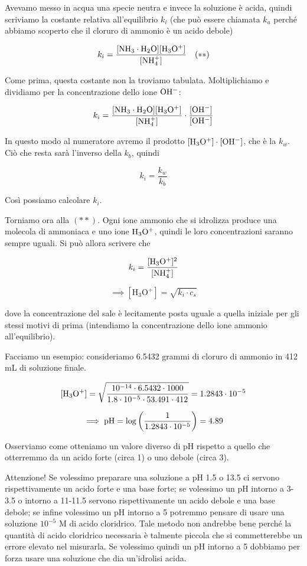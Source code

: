 Avevamo messo in acqua una specie neutra e invece la soluzione è acida, quindi scriviamo la costante relativa all'equilibrio $k_i$ (che può essere chiamata $k_a$ perché abbiamo scoperto che il cloruro di ammonio è un acido debole)

$$k_i=\rm \frac{[NH_3 \cdot H_2O][H_3O^+]}{[NH_4^+]} \quad (**)$$

Come prima, questa costante non la troviamo tabulata. Moltiplichiamo e dividiamo per la concentrazione dello ione $\rm OH^-$:

$$k_i=\rm \frac{[NH_3 \cdot H_2O][H_3O^+]}{[NH_4^+]} \cdot \frac{[OH^-]}{[OH^-]}$$

In questo modo al numeratore avremo il prodotto $\rm [H_3O^+] \cdot [OH^-]$, che è la $k_w$. Ciò che resta sarà l'inverso della $k_b$, quindi

$$k_i=\frac{k_w}{k_b}$$

Così possiamo calcolare $k_i$.

Torniamo ora alla $(**)$. Ogni ione ammonio che si idrolizza produce una molecola di ammoniaca e uno ione $\rm H_3O^+$, quindi le loro concentrazioni saranno sempre uguali. Si può allora scrivere che

$$k_i=\rm \frac{[H_3O^+]^2}{[NH_4^+]}$$

$$\implies [\text{H}_3\text{O}^+]=\sqrt{k_i \cdot c_s}$$

dove la concentrazione del sale è lecitamente posta uguale a quella iniziale per gli stessi motivi di prima (intendiamo la concentrazione dello ione ammonio all'equilibrio).

\vspace{0.2cm}Facciamo un esempio: consideriamo 6.5432 grammi di cloruro di ammonio in 412 mL di soluzione finale.

$$\rm [H_3O^+]=\sqrt{\frac{10^{-14} \cdot 6.5432 \cdot 1000}{1.8 \cdot 10^{-5} \cdot 53.491 \cdot 412}}=1.2843 \cdot 10^{-5}$$

$$\implies \rm pH=\log{\left( \frac{1}{1.2843 \cdot 10^{-5}} \right)}=4.89$$

Osserviamo come otteniamo un valore diverso di pH rispetto a quello che otterremmo da un acido forte (circa 1) o uno debole (circa 3).

Attenzione! Se volessimo preparare una soluzione a pH 1.5 o 13.5 ci servono rispettivamente un acido forte e una base forte; se volessimo un pH intorno a 3-3.5 o intorno a 11-11.5 servono rispettivamente un acido debole e una base debole; se infine volessimo un pH intorno a 5 potremmo pensare di usare una soluzione $10^{-5}$ M di acido cloridrico. Tale metodo non andrebbe bene perché la quantità di acido cloridrico necessaria è talmente piccola che si commetterebbe un errore elevato nel misurarla. Se volessimo quindi un pH intorno a 5 dobbiamo per forza usare una soluzione che dia un'idrolisi acida.


